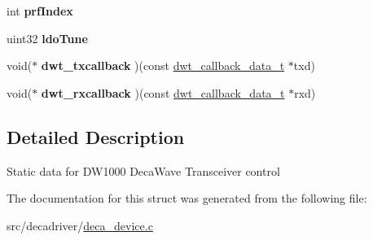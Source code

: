 \begin{DoxyCompactItemize}
\item 
\hypertarget{structdwt__local__data__t_a3940087909aff0b43a1822072699bd6f}{int {\bfseries prf\-Index}}\label{structdwt__local__data__t_a3940087909aff0b43a1822072699bd6f}

\item 
\hypertarget{structdwt__local__data__t_abd6ebfd7e54b9152f9b66cd26ea9740f}{uint32 {\bfseries ldo\-Tune}}\label{structdwt__local__data__t_abd6ebfd7e54b9152f9b66cd26ea9740f}

\item 
\hypertarget{structdwt__local__data__t_abfaa8d513897a5ae6ba6412365dfe935}{void($\ast$ {\bfseries dwt\-\_\-txcallback} )(const \hyperlink{structdwt__callback__data__t}{dwt\-\_\-callback\-\_\-data\-\_\-t} $\ast$txd)}\label{structdwt__local__data__t_abfaa8d513897a5ae6ba6412365dfe935}

\item 
\hypertarget{structdwt__local__data__t_a4b987e907c5fd07c4e2b5eda65a96741}{void($\ast$ {\bfseries dwt\-\_\-rxcallback} )(const \hyperlink{structdwt__callback__data__t}{dwt\-\_\-callback\-\_\-data\-\_\-t} $\ast$rxd)}\label{structdwt__local__data__t_a4b987e907c5fd07c4e2b5eda65a96741}

\end{DoxyCompactItemize}


\subsection{Detailed Description}
Static data for D\-W1000 Deca\-Wave Transceiver control 

The documentation for this struct was generated from the following file\-:\begin{DoxyCompactItemize}
\item 
src/decadriver/\hyperlink{deca__device_8c}{deca\-\_\-device.\-c}\end{DoxyCompactItemize}
